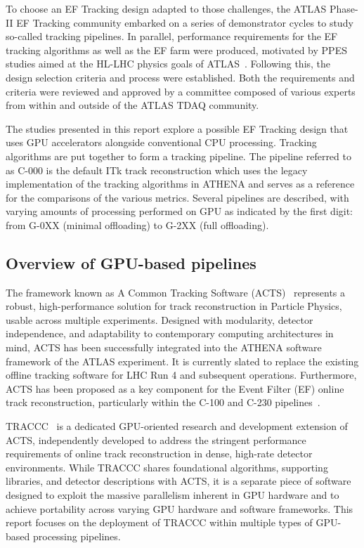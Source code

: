 To choose an EF Tracking design adapted to those challenges, the ATLAS Phase-II EF Tracking community embarked on a series of demonstrator cycles to study so-called tracking pipelines. In parallel, performance requirements for the EF tracking algorithms as well as the EF farm were produced, motivated by PPES studies aimed at the HL-LHC physics goals of ATLAS~\cite{trigger_studies_hl_lhc}. Following this, the design selection criteria and process were established. Both the requirements and criteria were reviewed and approved by a committee composed of various experts from within and outside of the ATLAS TDAQ community.

The studies presented in this report explore a possible EF Tracking design that uses GPU accelerators alongside conventional CPU processing. Tracking algorithms are put together to form a tracking pipeline. The pipeline referred to as C-000 is the default ITk track reconstruction which uses the legacy implementation of the tracking algorithms in ATHENA and serves as a reference for the comparisons of the various metrics. Several pipelines are described, with varying amounts of processing performed on GPU as indicated by the first digit: from G-0XX (minimal offloading) to G-2XX (full offloading). 

\subsection{Overview of GPU-based pipelines}
\label{sec:gpu_pipelines_overview}

The framework known as A Common Tracking Software (ACTS)~\cite{acts_2017} represents a robust, high-performance solution for track reconstruction in Particle Physics, usable across multiple experiments. Designed with modularity, detector independence, and adaptability to contemporary computing architectures in mind, ACTS has been successfully integrated into the ATHENA software framework of the ATLAS experiment. It is currently slated to replace the existing offline tracking software for LHC Run 4 and subsequent operations. Furthermore, ACTS has been proposed as a key component for the Event Filter (EF) online track reconstruction, particularly within the C-100 and C-230 pipelines~\cite{c100_pipeline_report}.

TRACCC~\cite{traccc_github} is a dedicated GPU-oriented research and development extension of ACTS, independently developed to address the stringent performance requirements of online track reconstruction in dense, high-rate detector environments. While TRACCC shares foundational algorithms, supporting libraries, and detector descriptions with ACTS, it is a separate piece of software designed to exploit the massive parallelism inherent in GPU hardware and to achieve portability across varying GPU hardware and software frameworks. This report focuses on the deployment of TRACCC within multiple types of GPU-based processing pipelines.

